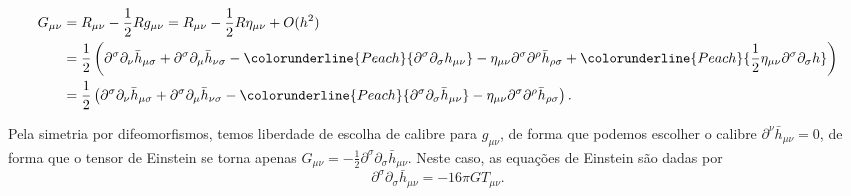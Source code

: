 \begin{align*}
    G_{\mu\nu} &= R_{\mu\nu} - \frac12 Rg_{\mu\nu} = R_{\mu\nu} - \frac12 R \eta_{\mu\nu} + O(h^2)\\
               &= \frac12 \left(\partial^\sigma\partial_\nu \bar{h}_{\mu\sigma} + \partial^\sigma\partial_\mu \bar{h}_{\nu\sigma} - \colorunderline{Peach}{\partial^\sigma \partial_\sigma h_{\mu\nu}} -  \eta_{\mu\nu} \partial^\sigma\partial^\rho \bar{h}_{\rho\sigma} + \colorunderline{Peach}{\frac12 \eta_{\mu\nu}\partial^\sigma \partial_\sigma h}\right)\\
               &= \frac12 \left(\partial^\sigma\partial_\nu \bar{h}_{\mu\sigma} + \partial^\sigma\partial_\mu \bar{h}_{\nu\sigma} - \colorunderline{Peach}{\partial^\sigma \partial_\sigma \bar{h}_{\mu\nu}} -\eta_{\mu\nu} \partial^\sigma\partial^\rho \bar{h}_{\rho\sigma} \right).
\end{align*}

Pela simetria por difeomorfismos, temos liberdade de escolha de calibre para \(g_{\mu\nu}\), de forma que podemos escolher o calibre \(\partial^\nu \bar{h}_{\mu\nu} = 0\), de forma que o tensor de Einstein se torna apenas \(G_{\mu\nu} = - \frac12 \partial^\sigma \partial_\sigma \bar{h}_{\mu\nu}\). Neste caso, as equações de Einstein são dadas por
\begin{equation*}
    \partial^\sigma\partial_\sigma \bar{h}_{\mu\nu} = - 16\pi GT_{\mu\nu}.
\end{equation*}

